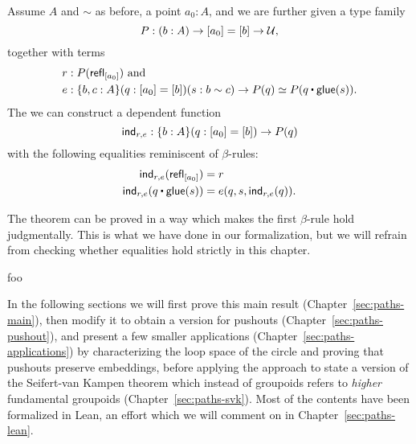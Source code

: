 \begin{thm}\label{thm:paths-main-thm}
Assume $A$ and $\sim$ as before, a point $a_0 : A$, and we are further given
a type family
\begin{equation*}
P : (b : A) \to [a_0] = [b] \to \mathcal{U} \text{,}
\end{equation*}
together with terms
\begin{align*}
r &: P(\refl_{[a_0]}) \text{ and} \\
e &: \{b, c : A\}(q : [a_0] = [b])(s : b \sim c) \to P(q) \simeq P(q \ct \glue(s)) \text{.}
\end{align*}
The we can construct a dependent function
\begin{equation*}
\mathsf{ind}_{r, e} : \{b : A\}(q : [a_0] = [b]) \to P(q)
\end{equation*}
with the following equalities reminiscent of $\beta$-rules:
\begin{align}
\ind_{r,e} (\refl_{[a_0]}) &= r \label{eq:paths-thm-based-first-beta} \\
\ind_{r,e}(q \ct \glue(s)) &= e (q,s, \mathsf{ind}_{r,e}(q)) \label{eq:paths-thm-based-second-beta} \text{.}
\end{align}
\end{thm}

\begin{remark}
The theorem can be proved in a way which makes the first $\beta$-rule hold judgmentally.
This is what we have done in our formalization, but we will refrain from checking
whether equalities hold strictly in this chapter.
\end{remark}

\begin{remark}
foo
\end{remark}

In the following sections we will first prove this main result (Chapter~\ref{sec:paths-main}),
then modify it to obtain a version for pushouts (Chapter~\ref{sec:paths-pushout}),
and present a few smaller applications (Chapter~\ref{sec:paths-applications})
by characterizing the loop space of the circle and proving that
pushouts preserve embeddings,
before applying the approach to state a version of the Seifert-van Kampen theorem
which instead of groupoids refers to \emph{higher} fundamental groupoids
(Chapter~\ref{sec:paths-svk}).
Most of the contents have been formalized in Lean, an effort which we will
comment on in Chapter~\ref{sec:paths-lean}.

